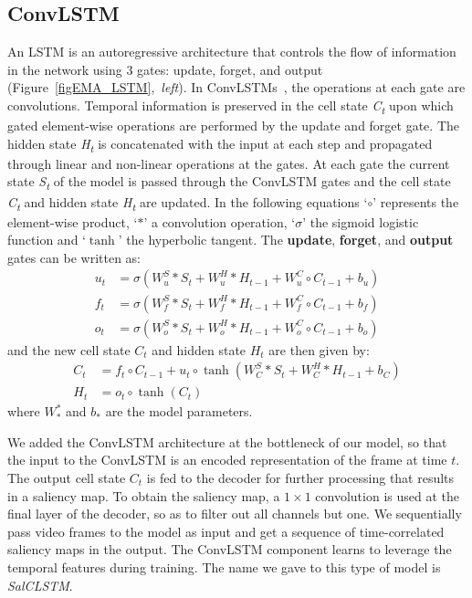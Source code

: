 \documentclass{bmvc2k}
\begin{document}
\subsection{ConvLSTM}  An LSTM is an autoregressive architecture that controls the flow of information in the network using 3 gates: update, forget, and output (Figure~\ref{figEMA_LSTM},~\textit{left}). In ConvLSTMs~\cite{CLSTM}, the operations at each gate are convolutions. Temporal information is preserved in the cell state \textit{C\textsubscript{t}} upon which gated element-wise operations are performed by the update and forget gate. The hidden state \textit{H\textsubscript{t}} is concatenated with the input at each step and propagated through linear and non-linear operations at the gates. At each gate the current state \textit{S\textsubscript{t}} of the model is passed through the ConvLSTM gates and the cell state \textit{C\textsubscript{t}} and hidden state \textit{H\textsubscript{t}} are updated. In the following equations `$\circ$' represents the element-wise product, `$\ast$' a convolution operation, `$\sigma$' the sigmoid logistic function and `$\tanh$' the hyperbolic tangent. 
The \textbf{update}, \textbf{forget}, and \textbf{output} gates can be written as:
\begin{align}
u_t &= \sigma(W_u^S\ast S_t + W_u^H\ast H_{t-1}+W_u^C\circ C_{t-1} + b_u) \\
f_t &= \sigma(W_f^S \ast S_t + W_f^H \ast H_{t-1} + W_f^C \circ C_{t-1} + b_f) \\
o_t &= \sigma(W_o^S \ast S_t + W_o^H \ast H_{t-1} + W_o^C \circ C_{t-1} + b_o)
\end{align}
and the new cell state $C_t$ and hidden state $H_t$ are then given by:
\begin{align}
C_t &= f_t \circ C_{t-1} + u_t \circ \tanh(W_C^S \ast S_t + W_C^H \ast H_{t-1} + b_C) \\
H_t &= o_t \circ \tanh(C_t)
\end{align}
where $W_*^*$ and $b_*$ are the model parameters. 


We added the ConvLSTM architecture at the bottleneck of our model, so that the input to the ConvLSTM is an encoded representation of the frame at time $t$. The output cell state $C_t$ is fed to the decoder for further processing that results in a saliency map. To obtain the saliency map, a $1\times1$ convolution is used at the final layer of the decoder, so as to filter out all channels but one. We sequentially pass video frames to the model as input and get a sequence of time-correlated saliency maps in the output. The ConvLSTM component learns to leverage the temporal features during training. The name we gave to this type of model is \textit{SalCLSTM}.
\end{document}
